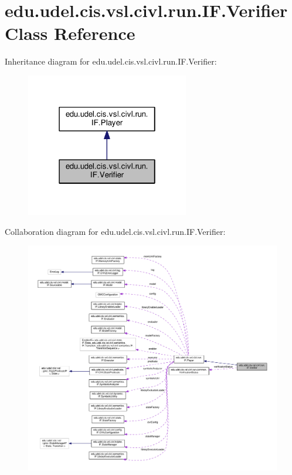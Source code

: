\hypertarget{classedu_1_1udel_1_1cis_1_1vsl_1_1civl_1_1run_1_1IF_1_1Verifier}{}\section{edu.\+udel.\+cis.\+vsl.\+civl.\+run.\+I\+F.\+Verifier Class Reference}
\label{classedu_1_1udel_1_1cis_1_1vsl_1_1civl_1_1run_1_1IF_1_1Verifier}


Inheritance diagram for edu.\+udel.\+cis.\+vsl.\+civl.\+run.\+I\+F.\+Verifier\+:
\nopagebreak
\begin{figure}[H]
\begin{center}
\leavevmode
\includegraphics[width=202pt]{classedu_1_1udel_1_1cis_1_1vsl_1_1civl_1_1run_1_1IF_1_1Verifier__inherit__graph}
\end{center}
\end{figure}


Collaboration diagram for edu.\+udel.\+cis.\+vsl.\+civl.\+run.\+I\+F.\+Verifier\+:
\nopagebreak
\begin{figure}[H]
\begin{center}
\leavevmode
\includegraphics[width=350pt]{classedu_1_1udel_1_1cis_1_1vsl_1_1civl_1_1run_1_1IF_1_1Verifier__coll__graph}
\end{center}
\end{figure}
